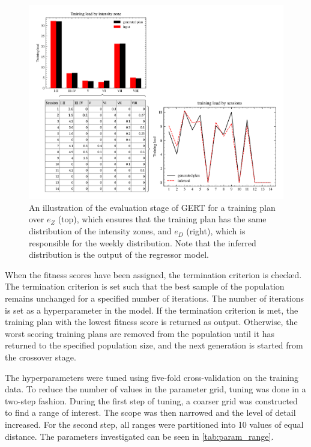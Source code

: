 \begin{figure}
    \centering
    \includegraphics[width=1.0\linewidth]{chapters/figures/implementation_plots/GERT_evaluation.pdf}
    \caption{An illustration of the evaluation stage of GERT for a training plan over $e_Z$ (top), which ensures that the training plan has the same distribution of the intensity zones, and $e_D$ (right), which is responsible for the weekly distribution. Note that the inferred distribution is the output of the regressor model.}
    \label{fig:GERT_evaluation}
\end{figure}

When the fitness scores have been assigned, the termination criterion is checked.
The termination criterion is set such that the best sample of the population remains unchanged for a specified number of iterations.
The number of iterations is set as a hyperparameter in the model.
If the termination criterion is met, the training plan with the lowest fitness score is returned as output.
Otherwise, the worst scoring training plans are removed from the population until it has returned to the specified population size, and the next generation is started from the crossover stage.


The hyperparameters were tuned using five-fold cross-validation on the training data.
To reduce the number of values in the parameter grid, tuning was done in a two-step fashion.
During the first step of tuning, a coarser grid was constructed to find a range of interest.
The scope was then narrowed and the level of detail increased.
For the second step, all ranges were partitioned into 10 values of equal distance.
The parameters investigated can be seen in \cref{tab:param_range}.

